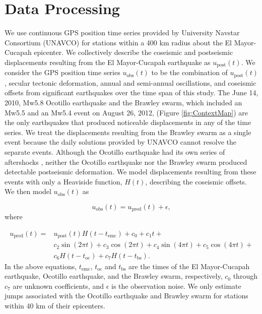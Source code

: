 \documentclass[draft,linenumbers]{AGUJournal}
\begin{document}
\section{Data Processing}\label{sec:Data}
We use continuous GPS position time series provided by University Navstar Consortium (UNAVCO) for stations within a 400 km radius about the El Mayor-Cucapah epicenter. We collectively describe the coseismic and postseismic displacements resulting from the El Mayor-Cucapah earthquake as $u_\mathrm{post}(t)$.  We consider the GPS position time series $u_\mathrm{obs}(t)$ to be the combination of $u_\mathrm{post}(t)$, secular tectonic deformation, annual and semi-annual oscillations, and coseismic offsets from significant earthquakes over the time span of this study.  The June 14, 2010, Mw5.8 Ocotillo earthquake and the Brawley swarm, which included an Mw5.5 and an Mw5.4 event on August 26, 2012, (Figure \ref{fig:ContextMap}) are the only earthquakes that produced noticeable displacements in any of the time series.  We treat the displacements resulting from the Brawley swarm as a single event because the daily solutions provided by UNAVCO cannot resolve the separate events.  Although the Ocotillo earthquake had its own series of aftershocks \citep{Hauksson2011}, neither the Ocotillo earthquake nor the Brawley swarm produced detectable postseismic deformation.  We model displacements resulting from these events with only a Heaviside function, $H(t)$, describing the coseismic offsets.  We then model $u_\mathrm{obs}(t)$ as 

\begin{equation}
  u_\mathrm{obs}(t) = u_\mathrm{pred}(t) + \epsilon,
\end{equation}
where

\begin{equation}\label{TimeSeriesModel}
  \begin{split}  
    u_\mathrm{pred}(t) = &u_\mathrm{post}(t)H(t-t_\mathrm{emc}) + c_0 + c_1t + \\
                         &c_2\sin(2\pi t) + c_3\cos(2\pi t) + c_4\sin(4\pi t) + c_5\cos(4\pi t) + \\
                         &c_6H(t-t_\mathrm{oc}) + c_7H(t-t_\mathrm{bs}).
  \end{split}
\end{equation}
In the above equations, $t_\mathrm{emc}$, $t_\mathrm{oc}$ and $t_\mathrm{bs}$ are the times of the El Mayor-Cucapah earthquake, Ocotillo earthquake, and the Brawley swarm, respectively, $c_0$ through $c_7$ are unknown coefficients, and $\epsilon$ is the observation noise. We only estimate jumps associated with the Ocotillo earthquake and Brawley swarm for stations within 40 km of their epicenters. 
\end{document}
